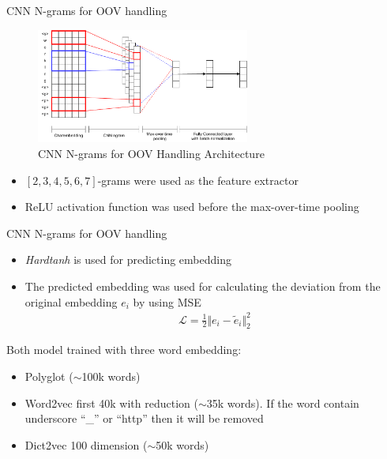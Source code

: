 \documentclass{beamer}
\begin{document}


\begin{frame}{CNN N-grams for OOV handling}
    \begin{figure}[H]
        \centering
        \includegraphics[width=70mm]{images/model_batchnorm}
        \caption{CNN N-grams for OOV Handling Architecture}
    \end{figure}
    \begin{itemize}
        \item $[2, 3, 4, 5, 6, 7]$-grams were used as the feature extractor
        \item ReLU activation function was used before the
        max-over-time pooling
    \end{itemize}
\end{frame}


\begin{frame}{CNN N-grams for OOV handling}
    \begin{itemize}
        \item \textit{Hardtanh} is used for predicting embedding
        \item The predicted embedding was used for calculating the
        deviation from the original embedding $e_i$ by using MSE
        \begin{align*}
            \mathcal{L} = \frac{1}{2}\Vert e_i - \tilde{e}_i \Vert^2_2
        \end{align*}
    \end{itemize}
    Both model trained with three word embedding:
    \begin{itemize}
        \item Polyglot ($\sim$100k words)
        \item Word2vec first 40k with reduction ($\sim$35k words). If the word
        contain underscore ``\_'' or ``http'' then it will be
        removed
        \item Dict2vec 100 dimension ($\sim$50k words)
    \end{itemize}
\end{frame}
\end{document}
